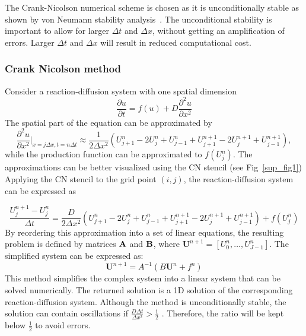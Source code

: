 \documentclass[10pt,letterpaper]{article}
\newcommand{\pdvn}[3]{\frac{\partial^{#1} {#2}}{\partial {#3}^{#1}}}
\begin{document}
The Crank-Nicolson numerical scheme is chosen as it is unconditionally stable as shown by von Neumann stability analysis~\parencite{strikwerda2004finite}.
The unconditional stability is important to allow for larger $\Delta t$ and $\Delta x$, without getting an amplification of errors. Larger $\Delta t$ and $\Delta x$ will result in reduced computational cost.


\subsubsection*{Crank Nicolson method}\label{cranknicolson}
Consider a reaction-diffusion system with one spatial dimension
\begin{equation}
    \frac{\partial u}{\partial t} =  f(u) + D\pdvn{2}{u}{x}
\end{equation}
The spatial part of the equation can be approximated by
\begin{equation}
    \pdvn{2}{u}{x} \biggr\rvert_{x=j\Delta x,t=n\Delta t} \approx \frac{1}{2\Delta x^{2}}\left( U^{n}_{j+1} -  2U^{n}_{j} + U^{n}_{j-1} + U^{n+1}_{j+1} - 2U^{n+1}_{j} + U^{n+1}_{j-1}\right),
\end{equation}
while the production function can be approximated to $f ( U^{n}_{j})$. The approximations can be better visualized using the CN stencil (see Fig~\ref{sup_fig1})
Applying the CN stencil to the grid point $(i, j)$, the reaction-diffusion system can be expressed as

\begin{equation}
    \frac{U^{n+1}_{j} - U^{n}_{j}}{\Delta t} = \frac{D}{2\Delta x^{2}}\left( U^{n}_{j+1} -  2U^{n}_{j} + U^{n}_{j-1} + U^{n+1}_{j+1} - 2U^{n+1}_{j} + U^{n+1}_{j-1}\right) +  f( U^{n}_{j})
    \label{CN_stencil}
\end{equation}
By reordering this approximation into a set of linear equations, the resulting problem is defined by matrices $\bf A$ and $\bf B$, where $\textbf{U}^{n+1} = [U^{n}_{0}, \ldots , U^{n}_{J-1}]$. The simplified system can be expressed as:
\begin{equation}
    \textbf{U}^{n+1} = A^{-1}(B\textbf{U}^{n} + f^{n})
\end{equation}
This method simplifies the complex system into a linear system that can be solved numerically. The returned solution is a 1D solution of the corresponding reaction-diffusion system. Although the method is unconditionally stable, the solution can contain oscillations if $ \frac{D\Delta t}{\Delta x^{2}} >\frac{1}{2} $ \parencite{trefethen1996finite}. Therefore, the ratio will be kept below $\frac{1}{2}$ to avoid errors.
\end{document}

